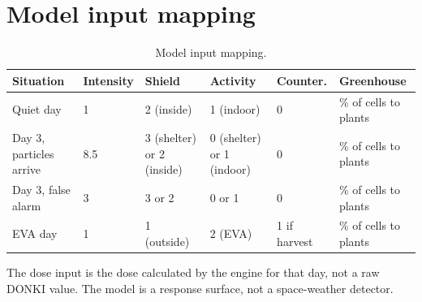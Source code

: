\documentclass[11pt,a4paper]{article}
\begin{document}
\section{Model input mapping}

\begin{table}[H]
\centering
\small
\begin{tabular}{@{}p{3.2cm}p{1.8cm}p{1.8cm}p{1.8cm}p{2.0cm}p{3.6cm}@{}}
\toprule
\textbf{Situation} & \textbf{Intensity} & \textbf{Shield} & \textbf{Activity} & \textbf{Counter.} & \textbf{Greenhouse}\\
\midrule
Quiet day & 1 & 2 (inside) & 1 (indoor) & 0 & \% of cells to plants\\
Day 3, particles arrive & 8.5 & 3 (shelter) or 2 (inside) & 0 (shelter) or 1 (indoor) & 0 & \% of cells to plants\\
Day 3, false alarm & 3 & 3 or 2 & 0 or 1 & 0 & \% of cells to plants\\
EVA day & 1 & 1 (outside) & 2 (EVA) & 1 if harvest & \% of cells to plants\\
\bottomrule
\end{tabular}
\caption{Model input mapping.}
\label{tab:modelmap}
\end{table}

The dose input is the dose calculated by the engine for that day, not a raw DONKI value. The model is a response surface, not a space-weather detector.
\end{document}
